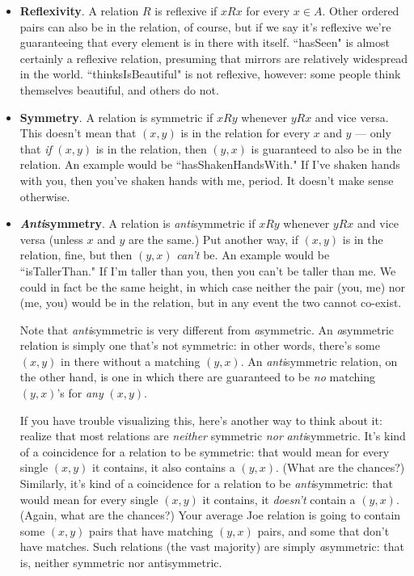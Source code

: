 \begin{itemize}

\item \textbf{Reflexivity}. A relation $R$ is reflexive if $x R x$ for
every $x \in A$. Other ordered pairs can also be in the relation, of
course, but if we say it's reflexive we're guaranteeing that every element
is in there with itself. ``hasSeen" is almost certainly a reflexive
relation, presuming that mirrors are relatively widespread in the world.
``thinksIsBeautiful" is not reflexive, however: some people think
themselves beautiful, and others do not.

\item \textbf{Symmetry}. A relation is symmetric if $x R y$ whenever $y R
x$ and vice versa. This doesn't mean that $(x,y)$ is in the relation for
every $x$ and $y$ --- only that \textit{if} $(x,y)$ is in the relation,
then $(y,x)$ is guaranteed to also be in the relation. An example would be
``hasShakenHandsWith." If I've shaken hands with you, then you've shaken
hands with me, period. It doesn't make sense otherwise.

\item \textbf{\textit{Anti}symmetry}. A relation is \textit{anti}symmetric
if $x$\sout{$R$}$y$ whenever $y R x$ and vice versa (unless $x$ and $y$ are
the same.) Put another way, if $(x,y)$ is in the relation, fine, but then
$(y,x)$ \textit{can't} be. An example would be ``isTallerThan." If I'm
taller than you, then you can't be taller than me. We could in fact be the
same height, in which case neither the pair (you, me) nor (me, you) would
be in the relation, but in any event the two cannot co-exist.

Note that \textit{anti}symmetric is very different from
\textit{a}symmetric. An \textit{a}symmetric relation is simply one that's
not symmetric: in other words, there's some $(x,y)$ in there without a
matching $(y,x)$. An \textit{anti}symmetric relation, on the other hand, is
one in which there are guaranteed to be \textit{no} matching $(y,x)$'s for
\textit{any} $(x,y)$.

If you have trouble visualizing this, here's another way to think about it:
realize that most relations are \textit{neither} symmetric \textit{nor}
\textit{anti}symmetric. It's kind of a coincidence for a relation to be
symmetric: that would mean for every single $(x,y)$ it contains, it also
contains a $(y,x)$. (What are the chances?) Similarly, it's kind of a
coincidence for a relation to be \textit{anti}symmetric: that would mean
for every single $(x,y)$ it contains, it \textit{doesn't} contain a
$(y,x)$. (Again, what are the chances?) Your average Joe relation is going
to contain some $(x,y)$ pairs that have matching $(y,x)$ pairs, and some
that don't have matches. Such relations (the vast majority) are simply
\textit{a}symmetric: that is, neither symmetric nor antisymmetric.


\end{itemize}
